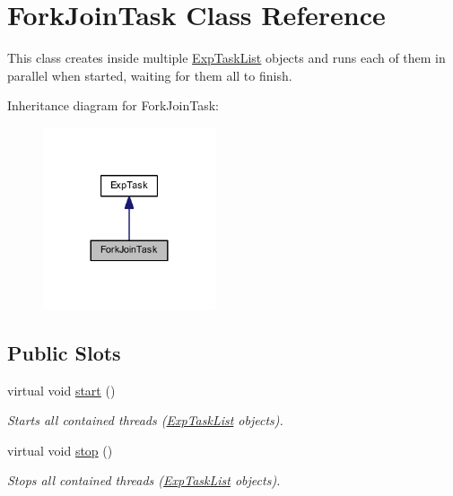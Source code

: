\hypertarget{class_fork_join_task}{}\section{Fork\+Join\+Task Class Reference}
\label{class_fork_join_task}


This class creates inside multiple \hyperlink{class_exp_task_list}{Exp\+Task\+List} objects and runs each of them in parallel when started, waiting for them all to finish.  




Inheritance diagram for Fork\+Join\+Task\+:\nopagebreak
\begin{figure}[H]
\begin{center}
\leavevmode
\includegraphics[width=144pt]{class_fork_join_task__inherit__graph}
\end{center}
\end{figure}
\subsection*{Public Slots}
\begin{DoxyCompactItemize}
\item 
\hypertarget{class_fork_join_task_a9a812b83e31dc58c6850d36b16008f0e}{}virtual void \hyperlink{class_fork_join_task_a9a812b83e31dc58c6850d36b16008f0e}{start} ()\label{class_fork_join_task_a9a812b83e31dc58c6850d36b16008f0e}

\begin{DoxyCompactList}\small\item\em Starts all contained threads (\hyperlink{class_exp_task_list}{Exp\+Task\+List} objects). \end{DoxyCompactList}\item 
\hypertarget{class_fork_join_task_adbd84bb9658e533fa4ca21841daedcc5}{}virtual void \hyperlink{class_fork_join_task_adbd84bb9658e533fa4ca21841daedcc5}{stop} ()\label{class_fork_join_task_adbd84bb9658e533fa4ca21841daedcc5}

\begin{DoxyCompactList}\small\item\em Stops all contained threads (\hyperlink{class_exp_task_list}{Exp\+Task\+List} objects). \end{DoxyCompactList}\end{DoxyCompactItemize}
